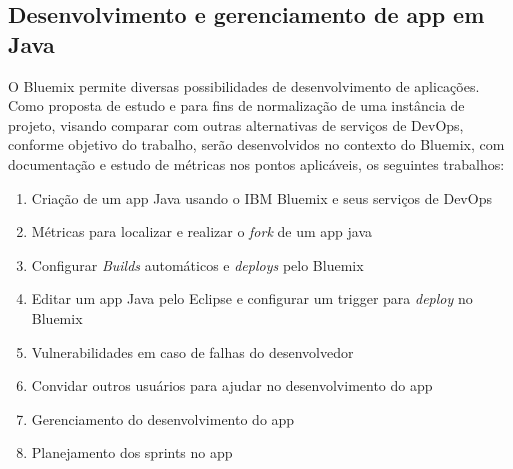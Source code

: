 \subsection{Desenvolvimento e gerenciamento de app em Java}

O Bluemix permite diversas possibilidades de desenvolvimento de aplicações. Como proposta de estudo e para fins de normalização de uma instância de projeto, visando comparar com outras alternativas de serviços de DevOps, conforme objetivo do trabalho, serão desenvolvidos no contexto do Bluemix, com documentação e estudo de métricas nos pontos aplicáveis, os seguintes trabalhos:
\begin{enumerate}
    \item Criação de um app Java usando o IBM Bluemix e seus serviços de DevOps
    \item Métricas para localizar e realizar o \textit{fork} de um app java
    \item Configurar \textit{Builds} automáticos e \textit{deploys} pelo Bluemix
    \item Editar um app Java pelo Eclipse e configurar um trigger para \textit{deploy} no Bluemix
    \item Vulnerabilidades em caso de falhas do desenvolvedor
    \item Convidar outros usuários para ajudar no desenvolvimento do app
    \item Gerenciamento do desenvolvimento do app
    \item Planejamento dos sprints no app
\end{enumerate}

